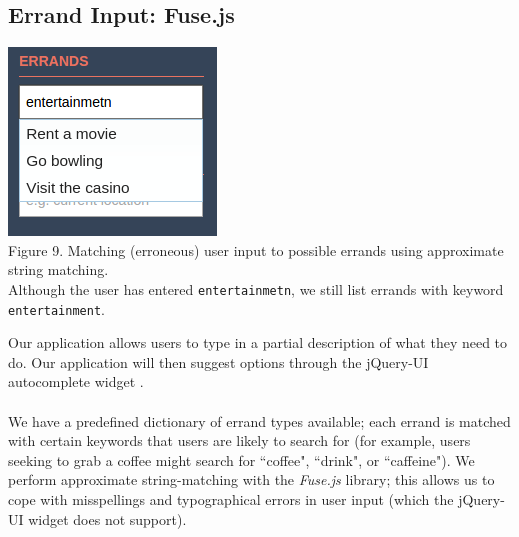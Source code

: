 \documentclass[a4paper, 10pt]{report}
\begin{document}
\subsection{Errand Input: Fuse.js}
\begin{center}
\includegraphics[scale=0.5]{fuzzy_search.png} \\
Figure 9. Matching (erroneous) user input to possible errands using approximate string matching.\\
Although the user has entered \texttt{entertainmetn}, we still list errands with keyword \texttt{entertainment}.
\end{center}
Our application allows users to type in a partial description of what they need to do. Our application will then suggest options through the jQuery-UI autocomplete widget \cite{jquery-autocomplete}.  \\\\ We have a predefined dictionary of errand types available; each errand is matched with certain keywords that users are likely to search for (for example, users seeking to grab a coffee might search for ``coffee", ``drink", or ``caffeine").
We perform approximate string-matching with the \textit{Fuse.js} library; this allows us to cope with misspellings and typographical errors in user input (which the jQuery-UI widget does not support). \cite{fuse-js}
\end{document}

